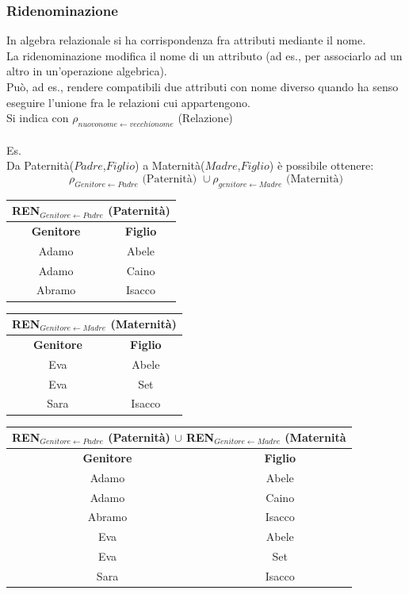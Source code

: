 \documentclass[../main.tex]{subfiles}
\begin{document}
	\subsubsection{Ridenominazione}
	In algebra relazionale si ha corrispondenza fra attributi mediante il nome.\\
	La ridenominazione modifica il nome di un attributo (ad es., per associarlo ad un altro in un’operazione algebrica).\\
	Può, ad es., rendere compatibili due attributi con nome diverso quando ha senso eseguire l’unione fra le relazioni cui appartengono.\\
	Si indica con $\rho_{nuovonome \leftarrow vecchionome}$ (Relazione)\\ \\
	Es.\\
	Da Paternità($Padre$,$Figlio$) a Maternità($Madre$,$Figlio$) è possibile ottenere:\\
	\[ \rho_{Genitore \leftarrow Padre}\text{ (Paternità) } \cup \rho_{genitore \leftarrow Madre}\text{ (Maternità)} \]
	\begin{center}
		\begin{tabular}{ |c|c| }
			\hline
			\multicolumn{2}{|c|}{REN$_{Genitore \leftarrow Padre}$ (Paternità)}\\
			\hline
			\textbf{Genitore} & \textbf{Figlio}\\
			\hline
			Adamo & Abele\\
			Adamo & Caino\\
			Abramo & Isacco\\
			\hline
		\end{tabular}
		\begin{tabular}{ |c|c| }
			\hline
			\multicolumn{2}{|c|}{REN$_{Genitore \leftarrow Madre}$ (Maternità)}\\
			\hline
			\textbf{Genitore} & \textbf{Figlio}\\
			\hline
			Eva & Abele\\
			Eva & Set\\
			Sara & Isacco\\
			\hline
		\end{tabular}
	\end{center}
	\begin{center}
		\begin{tabular}{ |c|c| }
			\hline
			\multicolumn{2}{|c|}{REN$_{Genitore \leftarrow Padre}$ (Paternità) $\cup$ REN$_{Genitore \leftarrow Madre}$ (Maternità}\\
			\hline
			\textbf{Genitore}& \textbf{Figlio}\\
			\hline
			Adamo & Abele\\
			Adamo & Caino\\
			Abramo & Isacco\\
			Eva & Abele\\
			Eva & Set\\
			Sara & Isacco\\
			\hline
		\end{tabular}
	\end{center}
\end{document}
